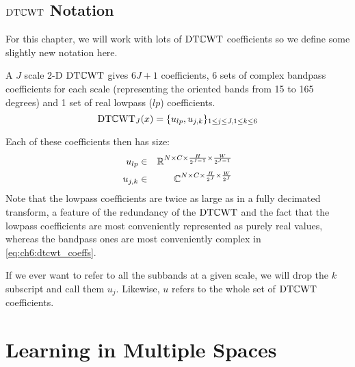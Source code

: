 \subsection{$\DTCWT$ Notation}
For this chapter, we will work with lots of $\DTCWT$ coefficients so we define
some slightly new notation here.

A $J$ scale 2-D $\DTCWT$ gives $6J+1$ coefficients, 6 sets of complex
bandpass coefficients for each scale (representing the oriented bands from 15 to 165
degrees) and 1 set of real lowpass ($lp$) coefficients. 
\begin{equation}
  \DTCWT_J(x) = \{ u_{lp}, u_{j,k} \}_{1\leq j\leq J, 1\leq k\leq 6}
  \label{eq:ch6:dtcwt_coeffs}
\end{equation}

Each of these coefficients then has size:
%
\begin{eqnarray}
  u_{lp} &\in & \reals[N\x C\x \frac{H}{2^{J-1}} \x \frac{W}{2^{J-1}}] \\
  u_{j,k} &\in & \complexes[N\x C\x \frac{H}{2^{J}}\x \frac{W}{2^{J}}]
\end{eqnarray}
%
Note that the lowpass coefficients are twice as large as in a fully decimated
transform, a feature of the redundancy of the $\DTCWT$ and the fact that the
lowpass coefficients are most conveniently represented as purely real values,
whereas the bandpass ones are most conveniently complex in \eqref{eq:ch6:dtcwt_coeffs}.

If we ever want to refer to all the subbands at a given scale, we will
drop the $k$ subscript and call them $u_j$. Likewise, $u$ refers to the whole
set of $\DTCWT$ coefficients.

\section{Learning in Multiple Spaces}\label{sec:ch6:learning}


